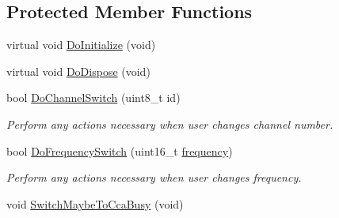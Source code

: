 \subsection*{Protected Member Functions}
\begin{DoxyCompactItemize}
\item 
virtual void \hyperlink{classns3_1_1WifiPhy_a68893b4e3f8a24af4f882906c42ce9c2}{Do\+Initialize} (void)
\item 
virtual void \hyperlink{classns3_1_1WifiPhy_a3666d8effffb593fe71b0499575d4003}{Do\+Dispose} (void)
\item 
bool \hyperlink{classns3_1_1WifiPhy_a373181dc2e4d4838ab979b5ca3831f4f}{Do\+Channel\+Switch} (uint8\+\_\+t id)
\begin{DoxyCompactList}\small\item\em Perform any actions necessary when user changes channel number. \end{DoxyCompactList}\item 
bool \hyperlink{classns3_1_1WifiPhy_ac70ec2cac73c12260f7d788422e27197}{Do\+Frequency\+Switch} (uint16\+\_\+t \hyperlink{mmwave_2model_2fading-traces_2fading__trace__generator_8m_a09045328d6d7e16aa4013f526cc6993d}{frequency})
\begin{DoxyCompactList}\small\item\em Perform any actions necessary when user changes frequency. \end{DoxyCompactList}\item 
void \hyperlink{classns3_1_1WifiPhy_a75f5905e356d1cdff251043fa10c158e}{Switch\+Maybe\+To\+Cca\+Busy} (void)
\end{DoxyCompactItemize}
